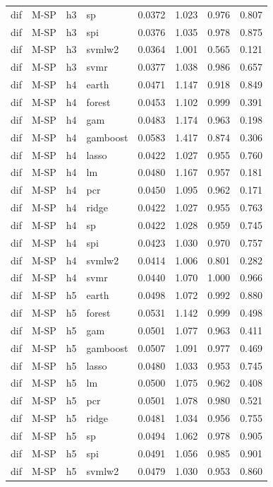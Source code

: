 \begin{ThreePartTable}
\begin{longtable}[t]{llclcccc}
dif & M-SP & h3 & sp & 0.0372 & 1.023 & 0.976 & 0.807\\
dif & M-SP & h3 & spi & 0.0376 & 1.035 & 0.978 & 0.875\\
dif & M-SP & h3 & svmlw2 & 0.0364 & 1.001 & 0.565 & 0.121\\
dif & M-SP & h3 & svmr & 0.0377 & 1.038 & 0.986 & 0.657\\
\addlinespace
dif & M-SP & h4 & earth & 0.0471 & 1.147 & 0.918 & 0.849\\
dif & M-SP & h4 & forest & 0.0453 & 1.102 & 0.999 & 0.391\\
dif & M-SP & h4 & gam & 0.0483 & 1.174 & 0.963 & 0.198\\
dif & M-SP & h4 & gamboost & 0.0583 & 1.417 & 0.874 & 0.306\\
dif & M-SP & h4 & lasso & 0.0422 & 1.027 & 0.955 & 0.760\\
dif & M-SP & h4 & lm & 0.0480 & 1.167 & 0.957 & 0.181\\
dif & M-SP & h4 & pcr & 0.0450 & 1.095 & 0.962 & 0.171\\
dif & M-SP & h4 & ridge & 0.0422 & 1.027 & 0.955 & 0.763\\
dif & M-SP & h4 & sp & 0.0422 & 1.028 & 0.959 & 0.745\\
dif & M-SP & h4 & spi & 0.0423 & 1.030 & 0.970 & 0.757\\
dif & M-SP & h4 & svmlw2 & 0.0414 & 1.006 & 0.801 & 0.282\\
dif & M-SP & h4 & svmr & 0.0440 & 1.070 & 1.000 & 0.966\\
\addlinespace
dif & M-SP & h5 & earth & 0.0498 & 1.072 & 0.992 & 0.880\\
dif & M-SP & h5 & forest & 0.0531 & 1.142 & 0.999 & 0.498\\
dif & M-SP & h5 & gam & 0.0501 & 1.077 & 0.963 & 0.411\\
dif & M-SP & h5 & gamboost & 0.0507 & 1.091 & 0.977 & 0.469\\
dif & M-SP & h5 & lasso & 0.0480 & 1.033 & 0.953 & 0.745\\
dif & M-SP & h5 & lm & 0.0500 & 1.075 & 0.962 & 0.408\\
dif & M-SP & h5 & pcr & 0.0501 & 1.078 & 0.980 & 0.521\\
dif & M-SP & h5 & ridge & 0.0481 & 1.034 & 0.956 & 0.755\\
dif & M-SP & h5 & sp & 0.0494 & 1.062 & 0.978 & 0.905\\
dif & M-SP & h5 & spi & 0.0491 & 1.056 & 0.985 & 0.901\\
dif & M-SP & h5 & svmlw2 & 0.0479 & 1.030 & 0.953 & 0.860\\

\end{longtable}
\end{ThreePartTable}
